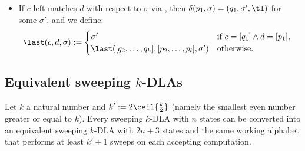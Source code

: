 \begin{defn}
\begin{itemize}
		\item If $c$ left-matches $d$ with respect to $\sigma$ via , then $\delta(p_1,\sigma)=(q_1,\sigma',\tl)$ for some $\sigma'$, and we define:
		      \begin{equation*}
			      \last(c,d,\sigma):=\begin{cases}
				      \sigma'                                        & \text{if } c=[q_1]\land d=[p_1],~~ \\
				      \last([q_2,\dots,q_h],[p_2,\dots,p_l],\sigma') & \text{otherwise}.
			      \end{cases}
		      \end{equation*}
	\end{itemize}
\end{defn}


\subsection{Equivalent sweeping \texorpdfstring{$k$}{k}-DLAs}
\begin{thrm}\label{thm:equiv-swep-dla}
	Let $k$ a natural number and $k':=2\ceil{\frac{k}{2}}$ (namely the smallest even number greater or equal to $k$).
	Every sweeping $k$-DLA with $n$ states can be converted into an equivalent sweeping $k$-DLA with $2n+3$ states and the same working alphabet that performs at least $k'+1$ sweeps on each accepting computation.
\end{thrm}

